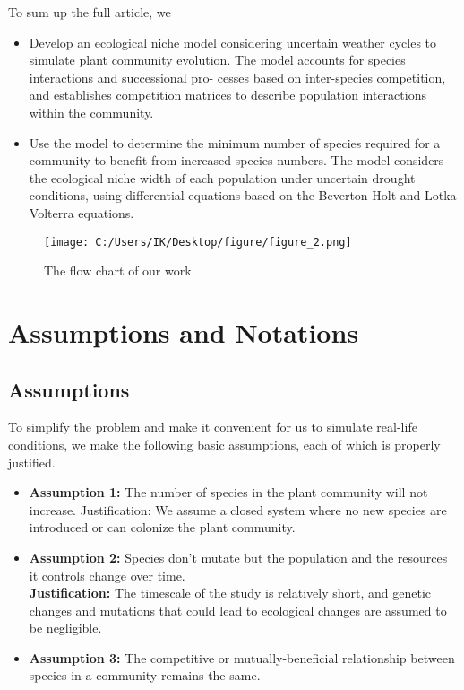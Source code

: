 \documentclass{mcmthesis}
\begin{document}
To sum up the full article, we
\begin{itemize}
	\item  Develop an ecological niche model considering uncertain weather cycles to simulate plant
	      community evolution. The model accounts for species interactions and successional pro-
	      cesses based on inter-species competition, and establishes competition matrices to describe
	      population interactions within the community.
	\item  Use the model to determine the minimum number of species required for a community to
	      benefit from increased species numbers. The model considers the ecological niche width of
	      each population under uncertain drought conditions, using differential equations based on
	      the Beverton Holt and Lotka Volterra equations.
\end{itemize}
\begin{figure}[htbp]
	\centering
	\texttt{[image: C:/Users/IK/Desktop/figure/figure\_2.png]}
	\caption{The flow chart of our work}
	\label{figure_2}
\end{figure}
\section{Assumptions and Notations}%
\subsection{Assumptions}

To simplify the problem and make it convenient for us to simulate real-life conditions, we make the
following basic assumptions, each of which is properly justified.
\begin{itemize}
	\item \textbf{Assumption 1:} The number of species in the plant community will not increase.
	      Justification: We assume a closed system where no new species are introduced or can
	      colonize the plant community.
	\item  \textbf{Assumption 2:} Species don't mutate but the population and the resources it controls change
	      over time.\\
	      \textbf{Justification:} The timescale of the study is relatively short, and genetic changes and mutations
	      that could lead to ecological changes are assumed to be negligible.
	\item \textbf{Assumption 3:} The competitive or mutually-beneficial relationship between species in a
	      community remains the same.
\end{itemize}
\end{document}
